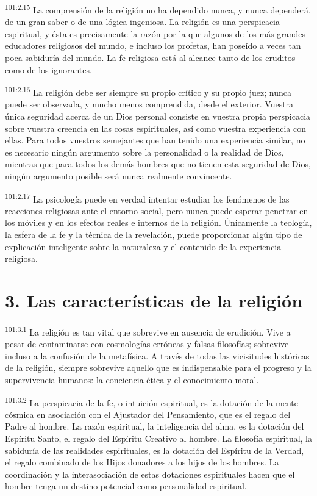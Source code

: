 \documentclass[twoside, 11pt]{book}
\begin{document}
\par
\textsuperscript{101:2.15} La comprensión de la religión no ha dependido nunca, y nunca dependerá, de un gran saber o de una lógica ingeniosa. La religión es una perspicacia espiritual, y ésta es precisamente la razón por la que algunos de los más grandes educadores religiosos del mundo, e incluso los profetas, han poseído a veces tan poca sabiduría del mundo. La fe religiosa está al alcance tanto de los eruditos como de los ignorantes.

\par
\textsuperscript{101:2.16} La religión debe ser siempre su propio crítico y su propio juez; nunca puede ser observada, y mucho menos comprendida, desde el exterior. Vuestra única seguridad acerca de un Dios personal consiste en vuestra propia perspicacia sobre vuestra creencia en las cosas espirituales, así como vuestra experiencia con ellas. Para todos vuestros semejantes que han tenido una experiencia similar, no es necesario ningún argumento sobre la personalidad o la realidad de Dios, mientras que para todos los demás hombres que no tienen esta seguridad de Dios, ningún argumento posible será nunca realmente convincente.

\par
\textsuperscript{101:2.17} La psicología puede en verdad intentar estudiar los fenómenos de las reacciones religiosas ante el entorno social, pero nunca puede esperar penetrar en los móviles y en los efectos reales e internos de la religión. Únicamente la teología, la esfera de la fe y la técnica de la revelación, puede proporcionar algún tipo de explicación inteligente sobre la naturaleza y el contenido de la experiencia religiosa.

\section*{3. Las características de la religión}
\par
\textsuperscript{101:3.1} La religión es tan vital que sobrevive en ausencia de erudición. Vive a pesar de contaminarse con cosmologías erróneas y falsas filosofías; sobrevive incluso a la confusión de la metafísica. A través de todas las vicisitudes históricas de la religión, siempre sobrevive aquello que es indispensable para el progreso y la supervivencia humanos: la conciencia ética y el conocimiento moral.

\par
\textsuperscript{101:3.2} La perspicacia de la fe, o intuición espiritual, es la dotación de la mente cósmica en asociación con el Ajustador del Pensamiento, que es el regalo del Padre al hombre. La razón espiritual, la inteligencia del alma, es la dotación del Espíritu Santo, el regalo del Espíritu Creativo al hombre. La filosofía espiritual, la sabiduría de las realidades espirituales, es la dotación del Espíritu de la Verdad, el regalo combinado de los Hijos donadores a los hijos de los hombres. La coordinación y la interasociación de estas dotaciones espirituales hacen que el hombre tenga un destino potencial como personalidad espiritual.
\end{document}
